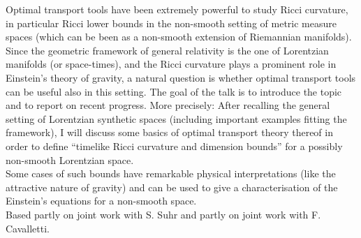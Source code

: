 \mypage
{}
\begin{myabstract}
Optimal transport tools have been extremely powerful to study Ricci curvature, in particular Ricci lower bounds in the non-smooth setting of metric measure spaces (which can be been as a non-smooth extension of Riemannian manifolds). Since the geometric framework of general relativity is the one of Lorentzian manifolds (or space-times), and the Ricci curvature plays a prominent role in Einstein’s theory of gravity, a natural question is whether optimal transport tools can be useful also in this setting. The goal of the talk is to introduce the topic and to report on recent progress. More precisely: After recalling the general setting of Lorentzian synthetic spaces (including important examples fitting the framework), I will discuss some basics of optimal transport theory thereof in order to define ``timelike Ricci curvature and dimension bounds'' for a possibly non-smooth Lorentzian space.\\\relax
Some cases of such bounds have remarkable physical interpretations (like the attractive nature of gravity) and can be used to give a characterisation of the Einstein's equations for a non-smooth space.\\\relax
Based partly on joint work with S. Suhr and partly on joint work with F. Cavalletti.
\end{myabstract}

